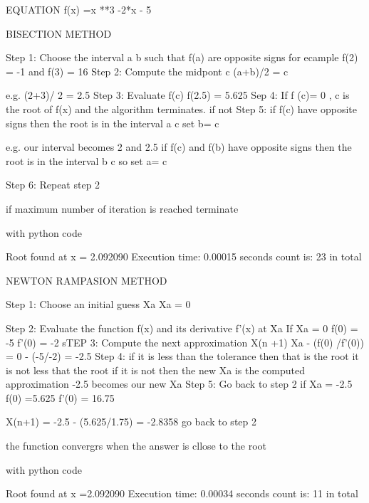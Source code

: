 \documentclass{}
\begin{document}
EQUATION
 f(x) =x **3 -2*x - 5

BISECTION METHOD

Step 1: Choose the interval a b such that f(a) are opposite signs
	for ecample f(2) = -1 and  f(3) = 16
Step 2: Compute the midpont c 
		(a+b)/2 = c

		e.g. (2+3)/ 2 = 2.5
Step 3: Evaluate f(c)
	f(2.5) = 5.625
Sep 4: If f (c)= 0 , c is the root of f(x) and the algorithm terminates.
if not 
Step 5: if f(c) have opposite signs then the root is in the interval a c 
	set b= c
	
	e.g. our interval becomes 2 and 2.5
	if f(c) and f(b) have opposite signs then the root is in the interval b c so 
	set a= c

	
Step 6: Repeat step 2

	




if maximum number of iteration is reached terminate 

with python code

Root found at x = 2.092090
Execution time: 0.00015 seconds
count is: 23 in total




NEWTON RAMPASION METHOD

Step 1: Choose an initial guess Xa
	Xa = 0

Step 2: Evaluate the function f(x) and its derivative f'(x) at Xa
		If Xa = 0
	          f(0) = -5
		f'(0) = -2
sTEP 3: Compute the next approximation X(n +1)
	Xa - (f(0) /f'(0)) = 0 - (-5/-2) = -2.5
Step 4: if it is less than the tolerance then that is the root
		it is not less that the root
	if it is not then the new Xa is the computed approximation 
		-2.5 becomes our new Xa
Step 5: Go back to step 2
	if Xa = -2.5
	f(0) =5.625
	f'(0) = 16.75
	 

	X(n+1) = -2.5 - (5.625/1.75) = -2.8358
	go back to step 2

the function convergrs when the answer is cllose to the root



with python code

Root found at x =2.092090
Execution time: 0.00034 seconds
count is: 11 in total
\end{document}
